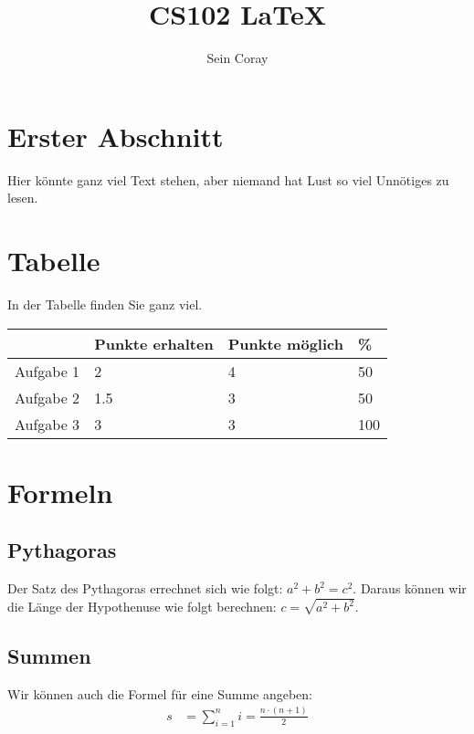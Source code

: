 \documentclass[11pt]{article}
\title{CS102 \LaTeX\spaceÜbung}
\author{Sein Coray}
\begin{document}
\maketitle
\section{Erster Abschnitt}
Hier könnte ganz viel Text stehen, aber niemand hat Lust so viel Unnötiges zu lesen.
\section{Tabelle}
In der Tabelle finden Sie ganz viel.
\begin{center}
		\begin{tabularx}{0.8\linewidth}{X|X|X|X}
			& Punkte erhalten & Punkte möglich & \% \\
			\hline
			Aufgabe 1 & 2 & 4 & 50 \\
			Aufgabe 2 & 1.5 & 3 & 50 \\
			Aufgabe 3 & 3 & 3 & 100
		\end{tabularx}
	\end{center}
\section{Formeln}
\subsection{Pythagoras}
	Der Satz des Pythagoras errechnet sich wie folgt: $a^{2} + b^{2} = c^{2}$. Daraus können
	wir die Länge der Hypothenuse wie folgt berechnen: $c = \sqrt{a^{2} + b^{2}}$.

\subsection{Summen}
	Wir können auch die Formel für eine Summe angeben:
	\begin{align}
		s &= \sum_{i=1}^{n}i = \frac{n \cdot (n + 1)}{2}
	\end{align}
\end{document}

